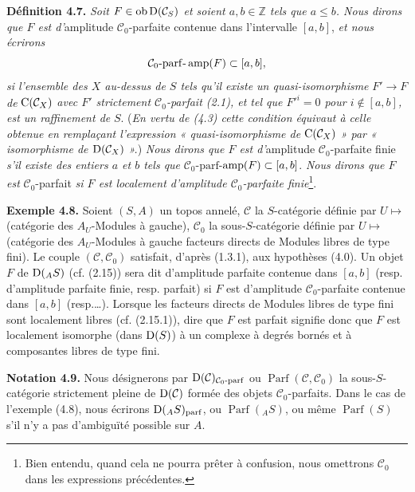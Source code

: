 \documentclass[11pt]{article}
\newcommand{\Parf}{\operatorname{Parf}}
\begin{document}
\textbf{Définition 4.7.} \emph{Soit \(F\in\operatorname{ob}\mathrm D(\mathcal C_S)\) et soient \(a,b\in\mathbb Z\) tels que \(a\leq b\). Nous dirons que \(F\) est d'}amplitude \(\mathcal C_0\)-parfaite contenue dans l'intervalle \([a,b]\), \emph{et nous écrirons}
\[
  \mathcal C_0\text{-}\mathrm{parf}\text{-}\operatorname{amp}(F)\subset[a,b],
\]
\emph{si l'ensemble des \(X\) au-dessus de \(S\) tels qu'il existe un quasi-isomorphisme} 
\(F'\to F\) \emph{de} \(\mathrm C(\mathcal C_X)\)
\emph{avec \(F'\) strictement \(\mathcal C_0\)-parfait (2.1), et tel que \(F'^i=0\) pour \(i\notin[a,b]\), est un raffinement de} \(S\). (\emph{En vertu de (4.3) cette condition équivaut à celle obtenue en remplaçant l'expression « quasi-isomorphisme de \(\mathrm C(\mathcal C_X)\) » par « isomorphisme de \(\mathrm D(\mathcal C_X)\) ».}) \emph{Nous dirons que \(F\) est d'}amplitude \(\mathcal C_0\)-parfaite finie \emph{s'il existe des entiers \(a\) et \(b\) tels que} \(\mathcal C_0\)-\(\mathrm{parf}\)-\(\operatorname{amp}(F)\subset[a,b]\). \emph{Nous dirons que \(F\) est} \(\mathcal C_0\)-parfait \emph{si \(F\) est localement d'amplitude \(\mathcal C_0\)-parfaite finie}\footnote{Bien entendu, quand cela ne pourra prêter à confusion, nous omettrons \(\mathcal C_0\) dans les expressions précédentes.}.

\textbf{Exemple 4.8.} Soient \((S,A)\) un topos annelé, \(\mathcal C\) la \(S\)-catégorie définie par \(U\longmapsto\) (catégorie des \(A_U\)-Modules à gauche), \(\mathcal C_0\) la sous-\(S\)-catégorie définie par \(U\longmapsto\) (catégorie des \(A_U\)-Modules à gauche facteurs directs de Modules libres de type fini). Le couple \((\mathcal C,\mathcal C_0)\) satisfait, d'après (1.3.1), aux hypothèses (4.0). Un objet \(F\) de \(\mathrm D(_A S)\) (cf. (2.15)) sera dit d'amplitude parfaite contenue dans \([a,b]\) (resp. d'amplitude parfaite finie, resp. parfait) si \(F\) est d'amplitude \(\mathcal C_0\)-parfaite contenue dans \([a,b]\) (resp.\dots). Lorsque les facteurs directs de Modules libres de type fini sont localement libres (cf. (2.15.1)), dire que \(F\) est parfait signifie donc que \(F\) est localement isomorphe (dans \(\mathrm D(S)\)) à un complexe à degrés bornés et à composantes libres de type fini.

\textbf{Notation 4.9.} Nous désignerons par \(\mathrm D(\mathcal C)_{\mathcal C_0\text{-}\mathrm{parf}}\) ou \(\Parf(\mathcal C,\mathcal C_0)\) la sous-\(S\)-catégorie strictement pleine de \(\mathrm D(\mathcal C)\) formée des objets \(\mathcal C_0\)-parfaits. Dans le cas de l'exemple (4.8), nous écrirons \(\mathrm D(_A S)_{\mathrm{parf}}\), ou \(\Parf(_A S)\), ou même \(\Parf(S)\) s'il n'y a pas d'ambiguïté possible sur \(A\).
\end{document}
